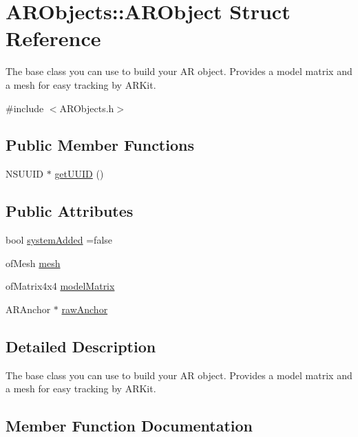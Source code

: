 \hypertarget{struct_a_r_objects_1_1_a_r_object}{}\section{A\+R\+Objects\+:\+:A\+R\+Object Struct Reference}
\label{struct_a_r_objects_1_1_a_r_object}


The base class you can use to build your AR object. Provides a model matrix and a mesh for easy tracking by A\+R\+Kit.  




{\ttfamily \#include $<$A\+R\+Objects.\+h$>$}

\subsection*{Public Member Functions}
\begin{DoxyCompactItemize}
\item 
N\+S\+U\+U\+ID $\ast$ \mbox{\hyperlink{struct_a_r_objects_1_1_a_r_object_a7b8bd58c0431abebd9cf97a32fc27fab}{get\+U\+U\+ID}} ()
\end{DoxyCompactItemize}
\subsection*{Public Attributes}
\begin{DoxyCompactItemize}
\item 
bool \mbox{\hyperlink{struct_a_r_objects_1_1_a_r_object_abb84b8f934ab23b396cc1904ba5c5569}{system\+Added}} =false
\item 
of\+Mesh \mbox{\hyperlink{struct_a_r_objects_1_1_a_r_object_a32c91c54c8ca0981e234603211372b88}{mesh}}
\item 
of\+Matrix4x4 \mbox{\hyperlink{struct_a_r_objects_1_1_a_r_object_ab77100dc107d550499f7c7fd5403c0ef}{model\+Matrix}}
\item 
A\+R\+Anchor $\ast$ \mbox{\hyperlink{struct_a_r_objects_1_1_a_r_object_a50fb9ac03adddf5d00783c7e10c8e1d8}{raw\+Anchor}}
\end{DoxyCompactItemize}


\subsection{Detailed Description}
The base class you can use to build your AR object. Provides a model matrix and a mesh for easy tracking by A\+R\+Kit. 

\subsection{Member Function Documentation}
\mbox{\label{struct_a_r_objects_1_1_a_r_object_a7b8bd58c0431abebd9cf97a32fc27fab}} 
